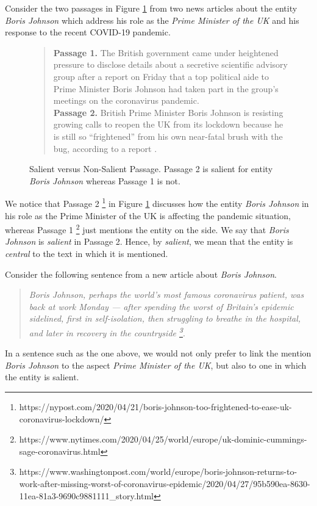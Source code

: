 Consider the two passages in Figure \ref{fig:Salience} from two news articles about the entity \textit{Boris Johnson} which address his role as the \textit{Prime Minister of the UK} and his response to the recent COVID-19 pandemic.
\begin{figure}[t]
    \centering
   \begin{quote}
\textbf{Passage 1.} The British government came under heightened pressure to disclose details about a secretive scientific advisory group after a report on Friday that a top political aide to Prime Minister Boris Johnson had taken part in the group’s meetings on the coronavirus pandemic. \\
\textbf{Passage 2.} British Prime Minister Boris Johnson is resisting growing calls to reopen the UK from its lockdown because he is still so “frightened” from his own near-fatal brush with the bug, according to a report .
\end{quote}
    \caption{Salient versus Non-Salient Passage. Passage 2 is salient for entity \textit{Boris Johnson} whereas Passage 1 is not.}
    \label{fig:Salience}
\end{figure}
We notice that Passage 2 \footnote{https://nypost.com/2020/04/21/boris-johnson-too-frightened-to-ease-uk-coronavirus-lockdown/} in Figure \ref{fig:Salience} discusses how the entity \textit{Boris Johnson} in his role as the Prime Minister of the UK is affecting the pandemic situation, whereas Passage 1 \footnote{https://www.nytimes.com/2020/04/25/world/europe/uk-dominic-cummings-sage-coronavirus.html} just mentions the entity on the side. We say that \textit{Boris Johnson} is \textit{salient} in Passage 2. Hence, by \textit{salient}, we mean that the entity is \textit{central} to the text in which it is mentioned. 


Consider the following sentence from a new article about \textit{Boris Johnson}.

\begin{quote}
    \textit{Boris Johnson, perhaps the world's most famous coronavirus patient, was back at work Monday — after spending the worst of Britain's epidemic sidelined, first in self-isolation, then struggling to breathe in the hospital, and later in recovery in the countryside \footnote{https://www.washingtonpost.com/world/europe/boris-johnson-returns-to-work-after-missing-worst-of-coronavirus-epidemic/2020/04/27/95b590ea-8630-11ea-81a3-9690c9881111\_story.html}}.
\end{quote}

In a sentence such as the one above, we would not only prefer to link the mention \textit{Boris Johnson} to the aspect \textit{Prime Minister of the UK}, but also to one in which the entity is salient. 